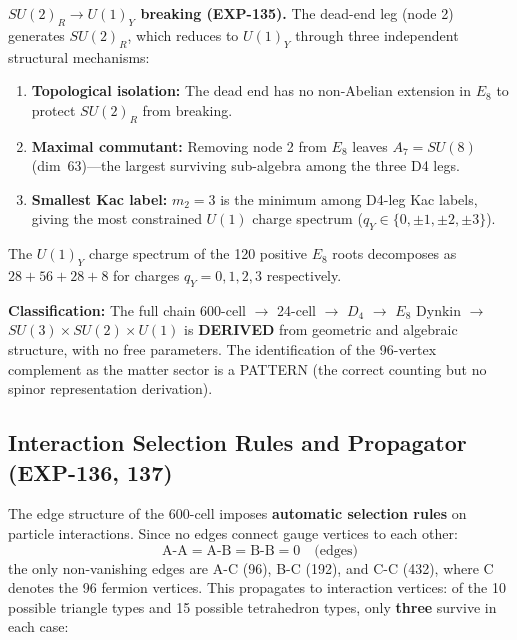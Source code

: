 \documentclass[12pt,a4paper]{article}
\begin{document}
\textbf{$SU(2)_R \to U(1)_Y$ breaking (EXP-135).} The dead-end leg (node 2) generates $SU(2)_R$, which reduces to $U(1)_Y$ through three independent structural mechanisms:
\begin{enumerate}
    \item \textbf{Topological isolation:} The dead end has no non-Abelian extension in $E_8$ to protect $SU(2)_R$ from breaking.
    \item \textbf{Maximal commutant:} Removing node 2 from $E_8$ leaves $A_7 = SU(8)$ (dim~63)---the largest surviving sub-algebra among the three D4 legs.
    \item \textbf{Smallest Kac label:} $m_2 = 3$ is the minimum among D4-leg Kac labels, giving the most constrained $U(1)$ charge spectrum ($q_Y \in \{0, \pm 1, \pm 2, \pm 3\}$).
\end{enumerate}
The $U(1)_Y$ charge spectrum of the 120 positive $E_8$ roots decomposes as $28 + 56 + 28 + 8$ for charges $q_Y = 0, 1, 2, 3$ respectively.

\textbf{Classification:} The full chain 600-cell $\to$ 24-cell $\to$ $D_4$ $\to$ $E_8$ Dynkin $\to$ $SU(3) \times SU(2) \times U(1)$ is \textbf{DERIVED} from geometric and algebraic structure, with no free parameters. The identification of the 96-vertex complement as the matter sector is a PATTERN (the correct counting but no spinor representation derivation).

\subsection{Interaction Selection Rules and Propagator (EXP-136, 137)}
\label{sec:interactions}

The edge structure of the 600-cell imposes \textbf{automatic selection rules} on particle interactions. Since no edges connect gauge vertices to each other:
\begin{equation}
\text{A-A} = \text{A-B} = \text{B-B} = 0 \quad \text{(edges)}
\end{equation}
the only non-vanishing edges are A-C (96), B-C (192), and C-C (432), where C denotes the 96 fermion vertices. This propagates to interaction vertices: of the 10 possible triangle types and 15 possible tetrahedron types, only \textbf{three} survive in each case:
\end{document}
